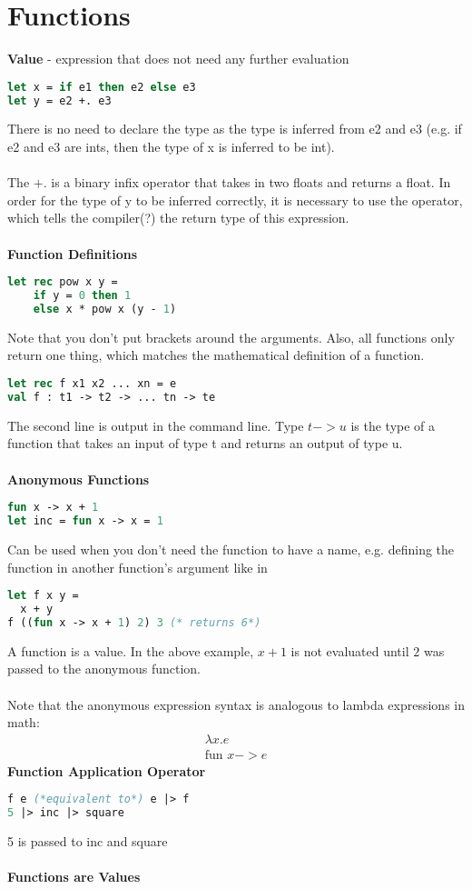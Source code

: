 \documentclass[12pt,a4paper]{article} %
\begin{document}
\section{Functions}
\textbf{Value} - expression that does not need any further evaluation
\begin{lstlisting}[language = Caml]
let x = if e1 then e2 else e3
let y = e2 +. e3
\end{lstlisting}
There is no need to declare the type as the type is inferred from e2 and e3 (e.g. if e2 and e3 are ints, then the type of x is inferred to be int).
\\\\
The $+.$ is a binary infix operator that takes in two floats and returns a float. In order for the type of y to be inferred correctly, it is necessary to use the operator, which tells the compiler(?) the return type of this expression.
\\\\
\textbf{Function Definitions}
\begin{lstlisting}[language = Caml]
let rec pow x y = 
	if y = 0 then 1
	else x * pow x (y - 1)
\end{lstlisting}
Note that you don't put brackets around the arguments. Also, all functions only return one thing, which matches the mathematical definition of a function.
\begin{lstlisting}[language = Caml]
let rec f x1 x2 ... xn = e
val f : t1 -> t2 -> ... tn -> te
\end{lstlisting}
The second line is output in the command line. Type $t -> u$ is the type of a function that takes an input of type t and returns an output of type u.
\\\\
\textbf{Anonymous Functions}
\begin{lstlisting}[language = Caml]
fun x -> x + 1
let inc = fun x -> x = 1
\end{lstlisting}
Can be used when you don't need the function to have a name, e.g. defining the function in another function's argument like in
\begin{lstlisting}[language = Caml]
let f x y = 
  x + y
f ((fun x -> x + 1) 2) 3 (* returns 6*)
\end{lstlisting}
A function is a value. In the above example, $ x+1 $ is not evaluated until $ 2$ was passed to the anonymous function.
\\\\
Note that the anonymous expression syntax is analogous to lambda expressions in math:
\begin{align*}
	\lambda x.e\\
	\text{fun }x -> e
\end{align*}
\textbf{Function Application Operator}
\begin{lstlisting}[language = Caml]
f e (*equivalent to*) e |> f
5 |> inc |> square
\end{lstlisting}
5 is passed to inc and square
\\\\
\textbf{Functions are Values}
\end{document}
